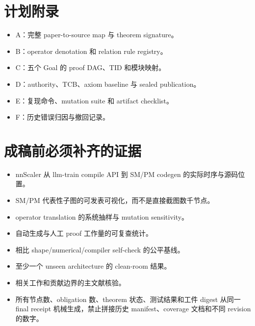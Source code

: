 \documentclass[11pt,a4paper]{ctexart}
\begin{document}
\appendix
\section{计划附录}
\begin{itemize}
  \item A：完整 paper-to-source map 与 theorem signature。
  \item B：operator denotation 和 relation rule registry。
  \item C：五个 Goal 的 proof DAG、TID 和模块映射。
  \item D：authority、TCB、axiom baseline 与 sealed publication。
  \item E：复现命令、mutation suite 和 artifact checklist。
  \item F：历史错误归因与撤回记录。
\end{itemize}

\section*{成稿前必须补齐的证据}
\begin{itemize}
  \item nnScaler 从 llm-train compile API 到 SM/PM codegen 的实际时序与源码位置。
  \item SM/PM 代表性子图的可发表可视化，而不是直接截图数千节点。
  \item operator translation 的系统抽样与 mutation sensitivity。
  \item 自动生成与人工 proof 工作量的可复查统计。
  \item 相比 shape/numerical/compiler self-check 的公平基线。
  \item 至少一个 unseen architecture 的 clean-room 结果。
  \item 相关工作和贡献边界的主文献核验。
  \item 所有节点数、obligation 数、theorem 状态、测试结果和工件 digest 从同一 final receipt 机械生成，禁止拼接历史 manifest、coverage 文档和不同 revision 的数字。
\end{itemize}
\end{document}
